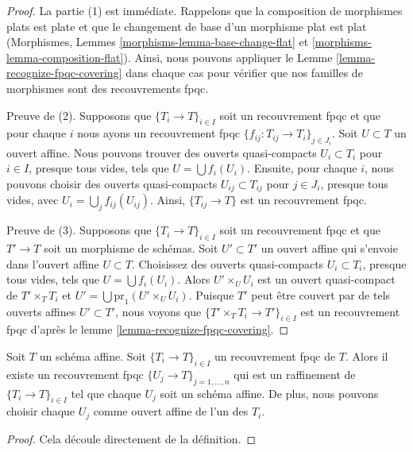 \begin{proof}
La partie (1) est immédiate. Rappelons que la composition de morphismes plats est plate et que le changement de base d'un morphisme plat est plat (Morphismes, Lemmes \ref{morphisms-lemma-base-change-flat} et \ref{morphisms-lemma-composition-flat}). Ainsi, nous pouvons appliquer le Lemme \ref{lemma-recognize-fpqc-covering} dans chaque cas pour vérifier que nos familles de morphismes sont des recouvrements fpqc.

\medskip\noindent
Preuve de (2). Supposons que $\{T_i \to T\}_{i\in I}$ soit un recouvrement fpqc et que pour chaque $i$ nous ayons un recouvrement fpqc $\{f_{ij} : T_{ij} \to T_i\}_{j\in J_i}$. Soit $U \subset T$ un ouvert affine. Nous pouvons trouver des ouverts quasi-compacts $U_i \subset T_i$ pour $i \in I$, presque tous vides, tels que $U = \bigcup f_i(U_i)$. Ensuite, pour chaque $i$, nous pouvons choisir des ouverts quasi-compacts $U_{ij} \subset T_{ij}$ pour $j \in J_i$, presque tous vides, avec $U_i = \bigcup_j f_{ij}(U_{ij})$. Ainsi, $\{T_{ij} \to T\}$ est un recouvrement fpqc.

\medskip\noindent
Preuve de (3). Supposons que $\{T_i \to T\}_{i\in I}$ soit un recouvrement fpqc et que $T' \to T$ soit un morphisme de schémas. Soit $U' \subset T'$ un ouvert affine qui s'envoie dans l'ouvert affine $U \subset T$. Choisissez des ouverts quasi-compacts $U_i \subset T_i$, presque tous vides, tels que $U = \bigcup f_i(U_i)$. Alors $U' \times_U U_i$ est un ouvert quasi-compact de $T' \times_T T_i$ et $U' = \bigcup \text{pr}_1(U' \times_U U_i)$. Puisque $T'$ peut être couvert par de tels ouverts affines $U' \subset T'$, nous voyons que $\{T' \times_T T_i \to T'\}_{i\in I}$ est un recouvrement fpqc d'après le lemme \ref{lemma-recognize-fpqc-covering}.
\end{proof}

\begin{lemma}
\label{lemma-fpqc-affine}
Soit $T$ un schéma affine. Soit $\{T_i \to T\}_{i \in I}$ un recouvrement fpqc de $T$. Alors il existe un recouvrement fpqc $\{U_j \to T\}_{j = 1, \ldots, n}$ qui est un raffinement de $\{T_i \to T\}_{i \in I}$ tel que chaque $U_j$ soit un schéma affine. De plus, nous pouvons choisir chaque $U_j$ comme ouvert affine de l’un des $T_i$.
\end{lemma}

\begin{proof}
Cela découle directement de la définition.
\end{proof}

